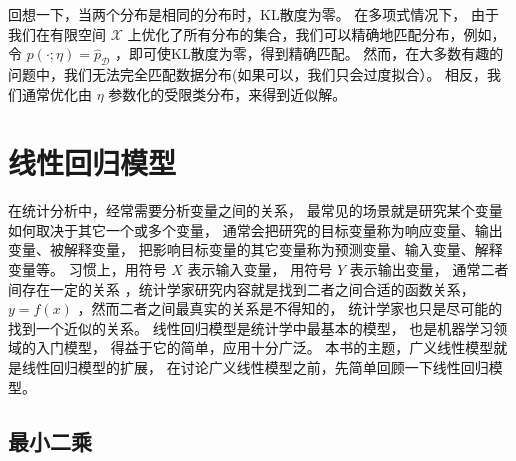 \documentclass[letterpaper,10pt,english]{sphinxmanual}
\begin{document}
回想一下，当两个分布是相同的分布时，KL散度为零。 在多项式情况下，
由于我们在有限空间 \(\mathcal{X}\) 上优化了所有分布的集合，我们可以精确地匹配分布，例如，
令 \(p(\cdot;\eta)=\hat{p}_{\mathcal{D}}\) ，即可使KL散度为零，得到精确匹配。
然而，在大多数有趣的问题中，我们无法完全匹配数据分布(如果可以，我们只会过度拟合）。
相反，我们通常优化由 \(\eta\) 参数化的受限类分布，来得到近似解。


\chapter{线性回归模型}
\label{\detokenize{_u7ebf_u6027_u56de_u5f52/content:ch-29}}\label{\detokenize{_u7ebf_u6027_u56de_u5f52/content:id1}}\label{\detokenize{_u7ebf_u6027_u56de_u5f52/content::doc}}
在统计分析中，经常需要分析变量之间的关系，
最常见的场景就是研究某个变量如何取决于其它一个或多个变量，
通常会把研究的目标变量称为响应变量、输出变量、被解释变量，
把影响目标变量的其它变量称为预测变量、输入变量、解释变量等。
习惯上，用符号 \(X\) 表示输入变量，
用符号 \(Y\)  表示输出变量，
通常二者间存在一定的关系
，统计学家研究内容就是找到二者之间合适的函数关系，
\(y=f(x)\)
，然而二者之间最真实的关系是不得知的，
统计学家也只是尽可能的找到一个近似的关系。
线性回归模型是统计学中最基本的模型，
也是机器学习领域的入门模型，
得益于它的简单，应用十分广泛。
本书的主题，广义线性模型就是线性回归模型的扩展，
在讨论广义线性模型之前，先简单回顾一下线性回归模型。


\section{最小二乘}
\label{\detokenize{_u7ebf_u6027_u56de_u5f52/content:id2}}
\end{document}
